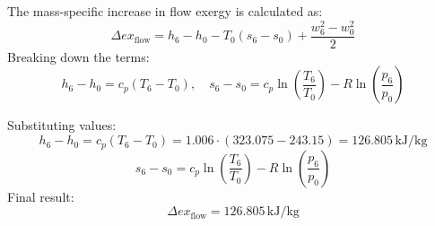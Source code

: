The mass-specific increase in flow exergy is calculated as:  
\[
\Delta ex_{\text{flow}} = h_6 - h_0 - T_0 (s_6 - s_0) + \frac{w_6^2 - w_0^2}{2}
\]  
Breaking down the terms:  
\[
h_6 - h_0 = c_p (T_6 - T_0), \quad s_6 - s_0 = c_p \ln \left( \frac{T_6}{T_0} \right) - R \ln \left( \frac{p_6}{p_0} \right)
\]  

Substituting values:  
\[
h_6 - h_0 = c_p (T_6 - T_0) = 1.006 \cdot (323.075 - 243.15) = 126.805 \, \text{kJ/kg}
\]  
\[
s_6 - s_0 = c_p \ln \left( \frac{T_6}{T_0} \right) - R \ln \left( \frac{p_6}{p_0} \right)
\]  
Final result:  
\[
\Delta ex_{\text{flow}} = 126.805 \, \text{kJ/kg}
\]